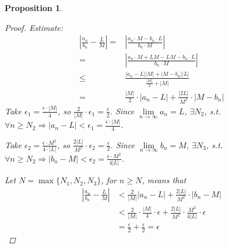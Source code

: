 \documentclass[12pt]{article}
\newcommand{\abs}[1]{\left| #1 \right|}
\theoremstyle{plain}
\newtheorem{proposition}{Proposition}[subsection]
\newcommand{\dlim}{\displaystyle\lim\limits}
\begin{document}
\begin{proposition}
\begin{enumerate}
\begin{proof}
                Estimate:
                \begin{align*}
                    \abs{\frac{a_n}{b_n} -\frac LM} 
                    =&\abs{\frac{a_n\cdot M -b_n\cdot L}{b_n\cdot M}}\\
                    =&\abs{\frac{a_n\cdot M + LM -LM-b_n\cdot L}{b_n\cdot M}}\\
                    \leq &\frac{\abs{a_n-L}\abs{M} + \abs{M-b_n}\abs{L}}
                    {\frac{\abs{M}}2 + \abs{M}}\\
                    =&\frac{\abs M}2 \cdot \abs{a_n-L} + 
                    \frac{\abs{2L}}{M^2} \cdot\abs{M-b_n}
                \end{align*}
                Take $\epsilon_1 = \frac{\epsilon\cdot \abs{M}}4$, so 
                $\frac2{\abs{M}} \cdot \epsilon_1 = \frac{\epsilon}2$. 
                Since $\dlim_{n\to\infty} a_n=L$, $\exists N_2$, s.t. 
                $\forall n \geq N_2 \Rightarrow \abs{a_n-L} 
                < \epsilon_1= \frac{\epsilon\cdot \abs{M}}4$. 
                
                Take $\epsilon_2 = \frac{\epsilon\cdot M^2}{4\cdot\abs{L}}$, so 
                $\frac{2\abs{L}}{M^2} \cdot \epsilon_2 = \frac{\epsilon}2$. 
                Since $\dlim_{n\to\infty} b_n=M$, $\exists N_3$, s.t. 
                $\forall n \geq N_2 \Rightarrow \abs{b_n-M} 
                < \epsilon_2= \frac{\epsilon\cdot M^2}{4\abs{L}}$. 

                Let $N = \max\{N_1, N_2, N_3\}$, for $n\geq N$, means that 
                \begin{align*}
                    \abs{\frac{a_n}{b_n}-\frac LM} &< 
                    \frac2{\abs{M}}\abs{a_n-L} + \frac{2\abs{L}}{M^2}\cdot \abs{b_n-M}\\
                    &<\frac2{\abs{M}}\cdot\frac{\abs{M}}4\cdot\epsilon+
                    \frac{2\abs{L}}{M^2}\cdot\frac{M^2}{4\abs{L}}\cdot\epsilon\\
                    &=\frac{\epsilon}2+\frac{\epsilon}2 = \epsilon
                \end{align*}                    
            \end{proof}
        \end{enumerate} 
    \end{proposition}
    
    
    
    \vspace{0.5 in}
\end{document}
